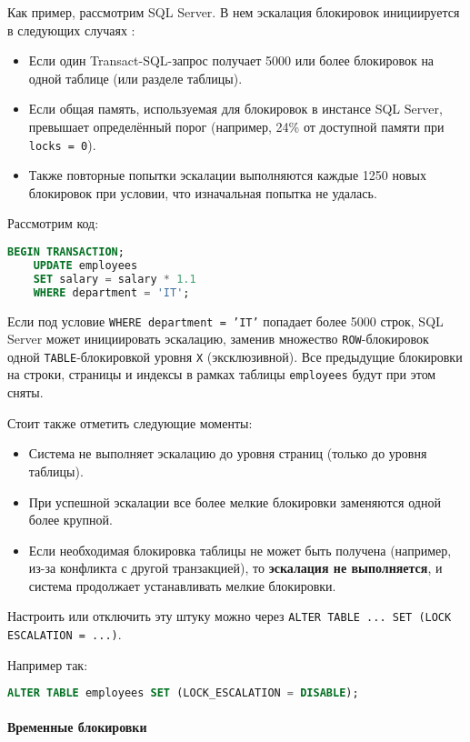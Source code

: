 Как пример, рассмотрим SQL Server. В нем эскалация блокировок инициируется в следующих случаях \autocite{MicrosoftLearnSQLserverTransLock}:
\begin{itemize}
    \item Если один Transact-SQL-запрос получает 5000 или более блокировок на одной таблице (или разделе таблицы).
    \item Если общая память, используемая для блокировок в инстансе SQL Server, превышает определённый порог (например, 24\% от доступной памяти при \texttt{locks = 0}).
    \item Также повторные попытки эскалации выполняются каждые 1250 новых блокировок при условии, что изначальная попытка не удалась.
\end{itemize}

Рассмотрим код:
\begin{lstlisting}[language=SQL]
    BEGIN TRANSACTION;
    UPDATE employees
    SET salary = salary * 1.1
    WHERE department = 'IT';
\end{lstlisting}

Если под условие \texttt{WHERE department = 'IT'} попадает более 5000 строк, SQL Server может инициировать эскалацию, заменив множество \texttt{ROW}-блокировок одной \texttt{TABLE}-блокировкой уровня \texttt{X} (эксклюзивной). Все предыдущие блокировки на строки, страницы и индексы в рамках таблицы \texttt{employees} будут при этом сняты.

Стоит также отметить следующие моменты:
\begin{itemize}
    \item Система не выполняет эскалацию до уровня страниц (только до уровня таблицы).
    \item При успешной эскалации все более мелкие блокировки заменяются одной более крупной.
    \item Если необходимая блокировка таблицы не может быть получена (например, из-за конфликта с другой транзакцией), то \textbf{эскалация не выполняется}, и система продолжает устанавливать мелкие блокировки.
\end{itemize}

Настроить или отключить эту штуку можно через \texttt{ALTER TABLE ... SET (LOCK ESCALATION = ...)}.

Например так:
\begin{lstlisting}[language=SQL]
    ALTER TABLE employees SET (LOCK_ESCALATION = DISABLE);
\end{lstlisting}

\paragraph{Временные блокировки} ~\\

